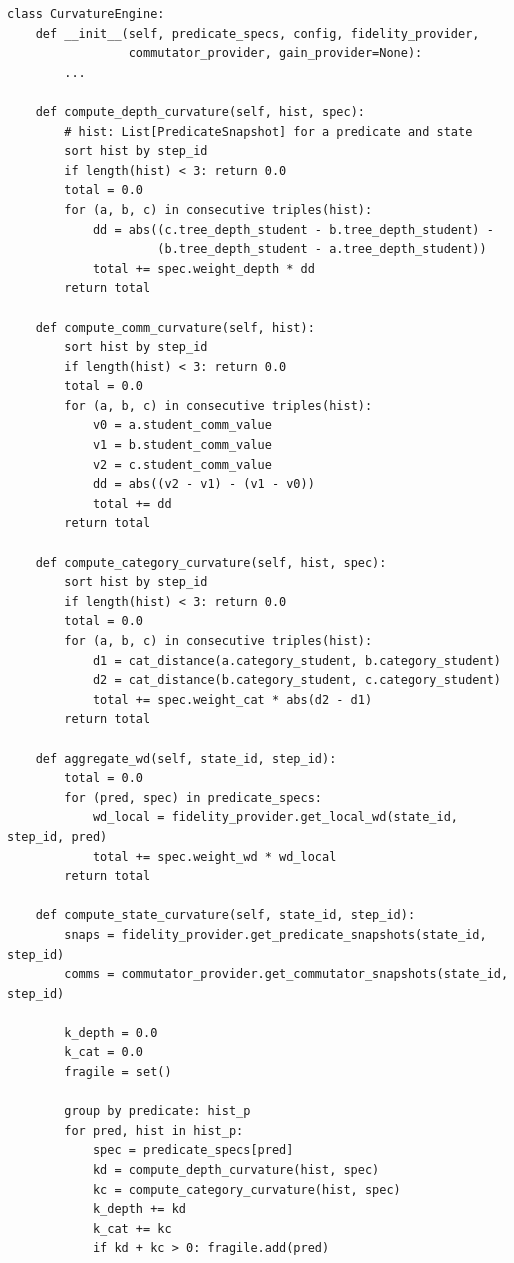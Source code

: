 \documentclass[11pt]{article}
\theoremstyle{definition}
\theoremstyle{plain}
\theoremstyle{remark}
\begin{document}
\begin{verbatim}
class CurvatureEngine:
    def __init__(self, predicate_specs, config, fidelity_provider,
                 commutator_provider, gain_provider=None):
        ...

    def compute_depth_curvature(self, hist, spec):
        # hist: List[PredicateSnapshot] for a predicate and state
        sort hist by step_id
        if length(hist) < 3: return 0.0
        total = 0.0
        for (a, b, c) in consecutive triples(hist):
            dd = abs((c.tree_depth_student - b.tree_depth_student) -
                     (b.tree_depth_student - a.tree_depth_student))
            total += spec.weight_depth * dd
        return total

    def compute_comm_curvature(self, hist):
        sort hist by step_id
        if length(hist) < 3: return 0.0
        total = 0.0
        for (a, b, c) in consecutive triples(hist):
            v0 = a.student_comm_value
            v1 = b.student_comm_value
            v2 = c.student_comm_value
            dd = abs((v2 - v1) - (v1 - v0))
            total += dd
        return total

    def compute_category_curvature(self, hist, spec):
        sort hist by step_id
        if length(hist) < 3: return 0.0
        total = 0.0
        for (a, b, c) in consecutive triples(hist):
            d1 = cat_distance(a.category_student, b.category_student)
            d2 = cat_distance(b.category_student, c.category_student)
            total += spec.weight_cat * abs(d2 - d1)
        return total

    def aggregate_wd(self, state_id, step_id):
        total = 0.0
        for (pred, spec) in predicate_specs:
            wd_local = fidelity_provider.get_local_wd(state_id, step_id, pred)
            total += spec.weight_wd * wd_local
        return total

    def compute_state_curvature(self, state_id, step_id):
        snaps = fidelity_provider.get_predicate_snapshots(state_id, step_id)
        comms = commutator_provider.get_commutator_snapshots(state_id, step_id)

        k_depth = 0.0
        k_cat = 0.0
        fragile = set()

        group by predicate: hist_p
        for pred, hist in hist_p:
            spec = predicate_specs[pred]
            kd = compute_depth_curvature(hist, spec)
            kc = compute_category_curvature(hist, spec)
            k_depth += kd
            k_cat += kc
            if kd + kc > 0: fragile.add(pred)


\end{verbatim}
\end{document}
